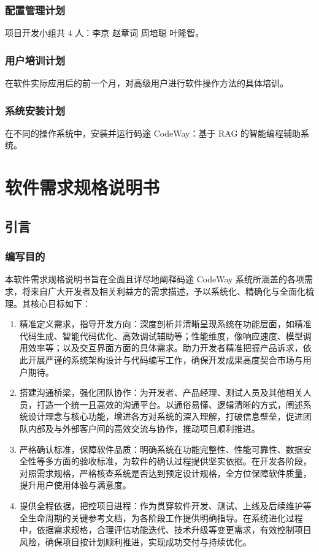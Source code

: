 \documentclass[
    report,     %
    oneside,    %
    UTF8,       %
    zihao=-4    %
]{config} %
\begin{document}
\subsection{配置管理计划}
项目开发小组共 4 人：李京 赵章词 周培聪 叶隆智。
\subsection{用户培训计划}
在软件实际应用后的前一个月，对高级用户进行软件操作方法的具体培训。
\subsection{系统安装计划}
在不同的操作系统中，安装并运行码途 CodeWay：基于 RAG 的智能编程辅助系统。


\chapter{软件需求规格说明书}
\section{引言}
\subsection{编写目的}
本软件需求规格说明书旨在全面且详尽地阐释码途 CodeWay 系统所涵盖的各项需求，将来自广大开发者及相关利益方的需求描述，予以系统化、精确化与全面化梳理。其核心目标如下：
\begin{enumerate}[label=(\arabic*)]
\item 精准定义需求，指导开发方向：深度剖析并清晰呈现系统在功能层面，如精准代码生成、智能代码优化、高效调试辅助等；性能维度，像响应速度、模型调用效率等；以及交互界面方面的具体需求。助力开发者精准把握产品诉求，依此开展严谨的系统架构设计与代码编写工作，确保开发成果高度契合市场与用户期待。
\item 搭建沟通桥梁，强化团队协作：为开发者、产品经理、测试人员及其他相关人员，打造一个统一且高效的沟通平台。以通俗易懂、逻辑清晰的方式，阐述系统设计理念与核心功能，增进各方对系统的深入理解，打破信息壁垒，促进团队内部及与外部客户间的高效交流与协作，推动项目顺利推进。
\item 严格确认标准，保障软件品质：明确系统在功能完整性、性能可靠性、数据安全性等多方面的验收标准，为软件的确认过程提供坚实依据。在开发各阶段，对照需求规格，严格核查系统是否达到预定设计规格，全方位保障软件质量，提升用户使用体验与满意度。
\item 提供全程依据，把控项目进程：作为贯穿软件开发、测试、上线及后续维护等全生命周期的关键参考文档，为各阶段工作提供明确指导。在系统进化过程中，依据需求规格，合理评估功能迭代、技术升级等变更需求，有效控制项目风险，确保项目按计划顺利推进，实现成功交付与持续优化。
\end{enumerate}
\end{document}
